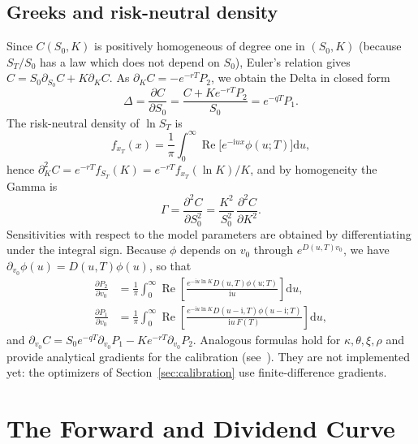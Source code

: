 \documentclass[11pt,a4paper]{article}
\theoremstyle{plain}
\theoremstyle{definition}
\newcommand{\dd}{\mathrm{d}}
\newcommand{\Real}{\operatorname{Re}}
\newcommand{\iu}{\mathrm{i}}
\begin{document}
\subsection{Greeks and risk-neutral density}
Since $C(S_0,K)$ is positively homogeneous of degree one in $(S_0,K)$ (because $S_T/S_0$ has a law which does not depend on $S_0$), Euler's relation gives $C=S_0\partial_{S_0}C+K\partial_KC$. As $\partial_KC=-e^{-rT}P_2$, we obtain the Delta in closed form
\begin{equation}
    \Delta=\frac{\partial C}{\partial S_0}=\frac{C+Ke^{-rT}P_2}{S_0}=e^{-qT}P_1.
    \label{eq:delta}
\end{equation}
The risk-neutral density of $\ln S_T$ is
\begin{equation*}
    f_{x_T}(x)=\frac1\pi\int_0^\infty\Real\bigl[e^{-\iu ux}\phi(u;T)\bigr]\dd u,
\end{equation*}
hence $\partial_K^2C=e^{-rT}f_{S_T}(K)=e^{-rT}f_{x_T}(\ln K)/K$, and by homogeneity the Gamma is
\begin{equation}
    \Gamma=\frac{\partial^2C}{\partial S_0^2}=\frac{K^2}{S_0^2}\,\frac{\partial^2C}{\partial K^2}.
\end{equation}
Sensitivities with respect to the model parameters are obtained by differentiating under the integral sign. Because $\phi$ depends on $v_0$ through $e^{D(u,T)v_0}$, we have $\partial_{v_0}\phi(u)=D(u,T)\phi(u)$, so that
\begin{align}
    \frac{\partial P_2}{\partial v_0}&=\frac1\pi\int_0^\infty\Real\!\left[\frac{e^{-\iu u\ln K}D(u,T)\phi(u;T)}{\iu u}\right]\dd u,\\
    \frac{\partial P_1}{\partial v_0}&=\frac1\pi\int_0^\infty\Real\!\left[\frac{e^{-\iu u\ln K}D(u-\iu,T)\phi(u-\iu;T)}{\iu u\,F(T)}\right]\dd u,
\end{align}
and $\partial_{v_0}C=S_0e^{-qT}\partial_{v_0}P_1-Ke^{-rT}\partial_{v_0}P_2$. Analogous formulas hold for $\kappa,\theta,\xi,\rho$ and provide analytical gradients for the calibration (see~\cite{cui}). They are not implemented yet: the optimizers of Section~\ref{sec:calibration} use finite-difference gradients.

\clearpage
\section{The Forward and Dividend Curve}
\label{sec:forward}
\end{document}
